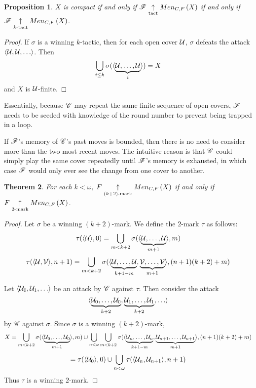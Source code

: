 \documentclass{amsart}
\newtheorem{theorem}{Theorem}[section]
\newtheorem{proposition}[theorem]{Proposition}
\theoremstyle{definition}
\begin{document}
\begin{proposition}
  \(X\) is compact if and only if
  \(\mathscr{F} \underset{\text{tact}}{\uparrow} Men_{C,F}\left({X}\right)\) if and only if
  \(\mathscr{F} \underset{k\text{-tact}}{\uparrow} Men_{C,F}\left({X}\right)\).
\end{proposition}

\begin{proof}
  If \(\sigma\) is a winning \(k\)-tactic, then for each open cover \(\mathcal{U}\),
  \(\sigma\) defeats the attack \(\<\mc U,\mc U,\dots\>\). Then
  \[
    \bigcup_{i\leq k} \sigma(\langle\underbrace{\mathcal{U},\dots,\mathcal{U}}_i\rangle) = X
  \]
  and \(X\) is \(\mathcal{U}\)-finite.
\end{proof}

Essentially, because \(\mathscr{C}\) may repeat the same finite sequence of open covers,
\(\mathscr{F}\) needs to be seeded with knowledge of the round number to prevent being
trapped in a loop.

If \(\mathscr{F}\)'s memory of \(\mathscr{C}\)'s past moves is bounded, then
there is no need to consider more than the two most recent moves. The
intuitive reason is that \(\mathscr{C}\) could simply play the same cover repeatedly
until \(\mathscr{F}\)'s memory is exhausted, in which case \(\mathscr{F}\) would only ever
see the change from one cover to another.

\begin{theorem}
  For each \(k<\omega\), \(F \underset{(k+2)\text{-mark}}{\uparrow} Men_{C,F}\left({X}\right)\)
  if and only if \(F \underset{2\text{-mark}}{\uparrow} Men_{C,F}\left({X}\right)\).
\end{theorem}

\begin{proof}
  Let \(\sigma\) be a winning \((k+2)\)-mark. We define the \(2\)-mark \(\tau\) as
  follows:
    \[
      \tau(\langle\mathcal{U}\rangle,0)
        =
      \bigcup_{m<k+2}
        \sigma(\langle\underbrace{\mathcal{U},\dots,\mathcal{U}}_{m+1}\rangle,m)
    \]
    \[
      \tau(\langle\mathcal{U},\mathcal{V}\rangle,n+1)
        =
      \bigcup_{m<k+2}
        \sigma(\langle
          \underbrace{\mathcal{U},\dots,\mathcal{U}}_{k+1-m},
          \underbrace{\mathcal{V},\dots,\mathcal{V}}_{m+1}
        \rangle,(n+1)(k+2)+m)
    \]

  Let \(\<\mc U_0,\mc U_1,\dots\>\) be an attack by \(\mathscr{C}\) against \(\tau\).
  Then consider the attack
    \[
      \<
        \underbrace{\mc U_0,\dots,\mc U_0}_{k+2},
        \underbrace{\mc U_1,\dots,\mc U_1}_{k+2},
        \dots
      \>
    \]
  by \(\mathscr{C}\) against \(\sigma\). Since \(\sigma\) is a winning \((k+2)\)-mark,
    \[
      X
        =
      \bigcup_{m<k+2}
        \sigma(\langle\underbrace{\mathcal{U}_0,\dots,\mathcal{U}_0}_{m+1}\rangle,m)
      \cup
      \bigcup_{n<\omega}
      \bigcup_{m<k+2}
        \sigma(\langle
          \underbrace{\mathcal{U}_n,\dots,\mathcal{U}_n}_{k+1-m},
          \underbrace{\mathcal{U}_{n+1},\dots,\mathcal{U}_{n+1}}_{m+1}
        \rangle,(n+1)(k+2)+m)
    \]
    \[
      =
      \tau(\langle\mathcal{U}_0\rangle,0)
      \cup
      \bigcup_{n<\omega}
      \tau(\langle\mathcal{U}_n,\mathcal{U}_{n+1}\rangle,n+1)
    \]
  Thus \(\tau\) is a winning \(2\)-mark.
\end{proof}
\end{document}
